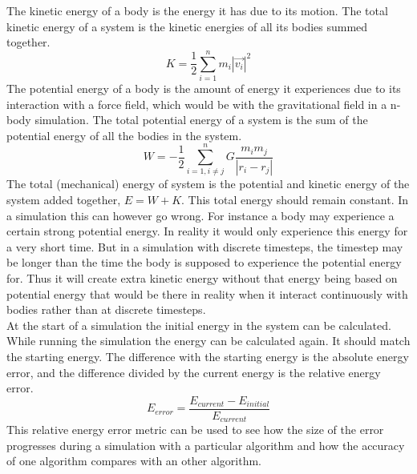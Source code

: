 \documentclass[11pt]{article} %
\begin{document}
The kinetic energy of a body is the energy it has due to its motion. The total kinetic energy of a system is the kinetic energies of all its bodies summed together.
\begin{equation}
    K = \frac{1}{2} \sum_{i=1}^n m_i |\vec{v_i}|^2
\end{equation}
The potential energy of a body is the amount of energy it experiences due to its interaction with a force field, which would be with the gravitational field in a n-body simulation. The total potential energy of a system is the sum of the potential energy of all the bodies in the system.
\begin{equation}
    W = -\frac{1}{2} \sum_{i=1, i \neq j}^n G \frac{m_i m_j}{|r_i - r_j|}
\end{equation}
The total (mechanical) energy of system is the potential and kinetic energy of the system added together, $E = W+K$. This total energy should remain constant. In a simulation this can however go wrong. For instance a body may experience a certain strong potential energy. In reality it would only experience this energy for a very short time. But in a simulation with discrete timesteps, the timestep may be longer than the time the body is supposed to experience the potential energy for. Thus it will create extra kinetic energy without that energy being based on potential energy that would be there in reality when it interact continuously with bodies rather than at discrete timesteps. \\
At the start of a simulation the initial energy in the system can be calculated. While running the simulation the energy can be calculated again. It should match the starting energy. The difference with the starting energy is the absolute energy error, and the difference divided by the current energy is the relative energy error.
\begin{equation}
    E_{error} = \frac{E_{current} - E_{initial}}{E_{current}}
\end{equation}
This relative energy error metric can be used to see how the size of the error progresses during a simulation with a particular algorithm and how the accuracy of one algorithm compares with an other algorithm.
\end{document}
